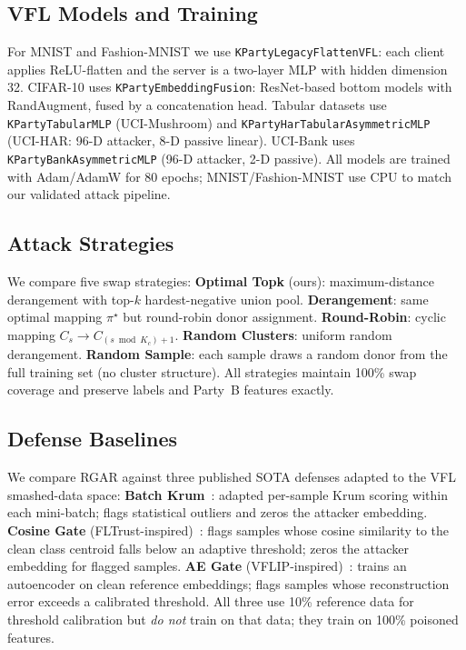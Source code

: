 \documentclass{article}
\begin{document}
\subsection{VFL Models and Training}
For MNIST and Fashion-MNIST we use \texttt{KPartyLegacyFlattenVFL}: each
client applies ReLU-flatten and the server is a two-layer MLP with hidden
dimension 32.
CIFAR-10 uses \texttt{KPartyEmbeddingFusion}: ResNet-based bottom models
with RandAugment, fused by a concatenation head.
Tabular datasets use \texttt{KPartyTabularMLP} (UCI-Mushroom) and
\texttt{KPartyHarTabularAsymmetricMLP} (UCI-HAR: 96-D attacker,
8-D passive linear).
UCI-Bank uses \texttt{KPartyBankAsymmetricMLP} (96-D attacker, 2-D passive).
All models are trained with Adam/AdamW for 80 epochs;
MNIST/Fashion-MNIST use CPU to match our validated attack pipeline.

\subsection{Attack Strategies}
We compare five swap strategies:
\textbf{Optimal Topk} (ours): maximum-distance derangement with top-$k$
hardest-negative union pool.
\textbf{Derangement}: same optimal mapping $\pi^\star$ but round-robin
donor assignment.
\textbf{Round-Robin}: cyclic mapping $C_s\!\to\!C_{(s\bmod K_c)+1}$.
\textbf{Random Clusters}: uniform random derangement.
\textbf{Random Sample}: each sample draws a random donor from the full
training set (no cluster structure).
All strategies maintain 100\% swap coverage and preserve labels and
Party~B features exactly.

\subsection{Defense Baselines}
We compare RGAR against three published SOTA defenses adapted to the
VFL smashed-data space:
\textbf{Batch Krum}~\citep{blanchard2017machine}: adapted per-sample
Krum scoring within each mini-batch; flags statistical outliers and
zeros the attacker embedding.
\textbf{Cosine Gate} (FLTrust-inspired)~\citep{cao2022fltrust}: flags
samples whose cosine similarity to the clean class centroid falls below
an adaptive threshold; zeros the attacker embedding for flagged samples.
\textbf{AE Gate} (VFLIP-inspired)~\citep{cho2024vflip}: trains an
autoencoder on clean reference embeddings; flags samples whose
reconstruction error exceeds a calibrated threshold.
All three use 10\% reference data for threshold calibration but
\emph{do not} train on that data; they train on 100\% poisoned features.
\end{document}
